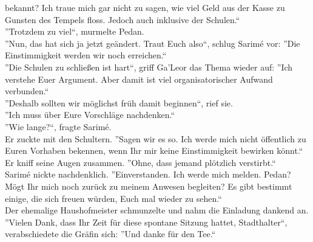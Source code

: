 bekannt? Ich traue mich gar nicht zu sagen, wie viel Geld aus der Kasse zu Gunsten des Tempels 
floss. Jedoch auch inklusive der Schulen.``\\
''Trotzdem zu viel``, murmelte Pedan.\\
''Nun, das hat sich ja jetzt geändert. Traut Euch also``, schlug Sarimé vor: ''Die Einstimmigkeit 
werden wir noch erreichen.``\\
''Die Schulen zu schließen ist hart``, griff Ga'Leor das Thema wieder auf: ''Ich verstehe Euer 
Argument. Aber damit ist viel organisatorischer Aufwand verbunden.``\\
''Deshalb sollten wir möglichst früh damit beginnen``, rief sie.\\
''Ich muss über Eure Vorschläge nachdenken.``\\
''Wie lange?``, fragte Sarimé.\\
Er zuckte mit den Schultern. ''Sagen wir es so. Ich werde mich nicht öffentlich zu Euren Vorhaben 
bekennen, wenn Ihr mir keine Einstimmigkeit bewirken könnt.`` Er kniff seine Augen zusammen. 
''Ohne, dass jemand plötzlich verstirbt.``\\
Sarimé nickte nachdenklich. ''Einverstanden. Ich werde mich melden. Pedan? Mögt Ihr mich noch 
zurück zu meinem Anwesen begleiten? Es gibt bestimmt einige, die sich freuen würden, Euch mal 
wieder zu sehen.``\\
Der ehemalige Haushofmeister schmunzelte und nahm die Einladung dankend an.\\
''Vielen Dank, dass Ihr Zeit für diese spontane Sitzung hattet, Stadthalter``, verabschiedete die 
Gräfin sich: ''Und danke für den Tee.``\\

